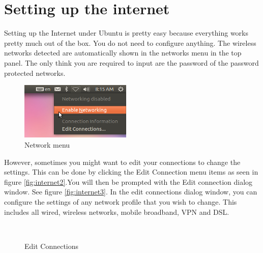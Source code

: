 \section{Setting up the internet} 
Setting up the Internet under Ubuntu is pretty easy because everything works pretty much out of the box. You do not need to configure anything. The wireless networks detected are automatically shown in the networks menu in the top panel. The only think you are required to input are the password of the password protected networks. \\

\begin{figure}[h!]	
	\centering
	\includegraphics[width=150pt]{./images/basic-tasks/internet1.png}
	\caption{Network menu}	
	\label{fig:internet1}		
\end{figure}

\par \noindent However, sometimes you might want to edit your connections to change the settings. This can be done by clicking the Edit Connection menu items as seen in figure \ref{fig:internet2}.You will then be prompted with the Edit connection dialog window. See figure \ref{fig:internet3}. In the edit connections dialog window, you can configure the settings of any network profile that you wish to change. This includes all wired, wireless networks, mobile broadband, VPN and DSL. \\

\begin{figure}[ht!]	
		\centering		
		~ \hspace{0.5in}
		\caption{Edit Connections}
		\label{fig:internet23}
\end{figure}

